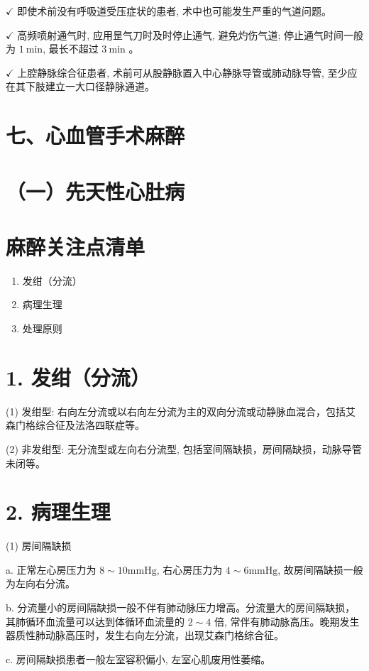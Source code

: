 \documentclass[10pt]{article}
\begin{document}
$\checkmark$ 即使术前没有呼吸道受压症状的患者, 术中也可能发生严重的气道问题。

$\checkmark$ 高频喷射通气时, 应用昰气刀时及时停止通气, 避免灼伤气道; 停止通气时间一般为 $1 \mathrm{~min}$, 最长不超过 $3 \mathrm{~min}$ 。

$\checkmark$ 上腔静脉综合征患者, 术前可从股静脉置入中心静脉导管或肺动脉导管, 至少应在其下肢建立一大口径静脉通道。

\section*{七、心血管手术麻醉}
\section*{（一）先天性心肚病}
\section*{麻醉关注点清单}
\begin{enumerate}
  \item 发绀（分流）

  \item 病理生理

  \item 处理原则

\end{enumerate}

\section*{1. 发绀（分流）}
(1) 发绀型: 右向左分流或以右向左分流为主的双向分流或动静脉血混合，包括艾森门格综合征及法洛四联症等。

(2) 非发绀型: 无分流型或左向右分流型, 包括室间隔缺损，房间隔缺损，动脉导管未闭等。

\section*{2. 病理生理}
(1) 房间隔缺损

a. 正常左心房压力为 $8 \sim 10 \mathrm{mmHg}$, 右心房压力为 $4 \sim 6 \mathrm{mmHg}$, 故房间隔缺损一般为左向右分流。

b. 分流量小的房间隔缺损一般不伴有肺动脉压力增高。分流量大的房间隔缺损，其肺循环血流量可以达到体循环血流量的 $2 \sim 4$ 倍, 常伴有肺动脉高压。晚期发生器质性肺动脉高压时，发生右向左分流，出现艾森门格综合征。

c. 房间隔缺损患者一般左室容积偏小, 左室心肌废用性萎缩。
\end{document}
